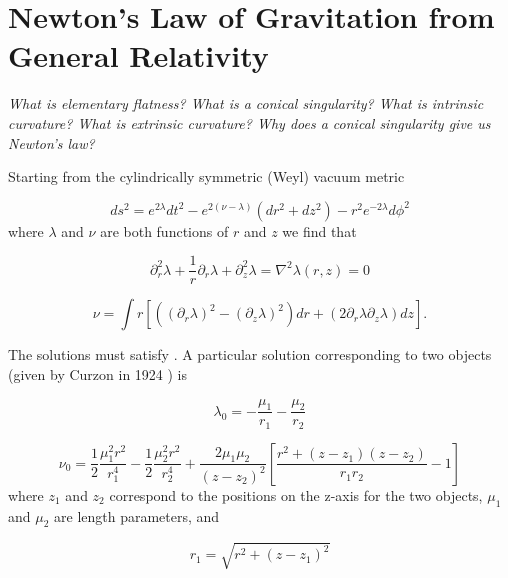 \documentclass[12pt]{article}
\begin{document}
\section{Newton's Law of Gravitation from General Relativity}
\label{sec:newtons-law}

\textit{What is elementary flatness? What is a conical singularity? What is intrinsic curvature? What is extrinsic curvature? Why does a conical singularity give us Newton's law?}

Starting from the cylindrically symmetric (Weyl) vacuum metric \cite{synge_relativity}

\begin{equation}
	ds^{2}=e^{2\lambda}dt^{2}-e^{2\left(\nu-\lambda\right)}\left(dr^{2}+dz^{2}\right)-r^{2}e^{-2\lambda}d\phi^{2}
	\label{eq:weyl-vacuum-metric}
\end{equation}
where $\lambda$ and $\nu$ are both functions of $r$ and $z$ we find that

\begin{equation}
\partial^{2}_{r}\lambda+\frac{1}{r}\partial_{r}\lambda+\partial^{2}_{z}\lambda=\nabla^2\lambda(r,z)=0
\label{eq:laplace-r-z}
\end{equation}

\begin{equation}
\nu=\int r[\left(\left(\partial_{r}\lambda\right)^{2}-\left(\partial_{z}\lambda\right)^{2}\right)dr+\left(2\partial_{r}\lambda\partial_{z}\lambda\right)dz].
\label{eq:nu}
\end{equation}

The solutions must satisfy . A particular solution corresponding to two objects (given by Curzon in 1924 \cite{curzon1924} ) is

\begin{equation}
\lambda_0=-\frac{\mu_1}{r_1}-\frac{\mu_2}{r_2}
\label{eq:lambda-0}
\end{equation}

\begin{equation}
	\label{eq:nu-0}
	\nu_0=\frac{1}{2}\frac{\mu_{1}^{2}r^2}{r_{1}^{4}}-\frac{1}{2}\frac{\mu_{2}^{2}r^2}{r_{2}^{4}}+\frac{2\mu_1\mu_2}{(z-z_2)^2}\left[\frac{r^2+(z-z_1)(z-z_2)}{r_{1}r_{2}}-1\right]
\end{equation}
where $z_1$ and $z_2$ correspond to the positions on the z-axis for the two objects, $\mu_1$ and $\mu_2$ are length parameters, and

\begin{equation}
r_1=\sqrt{r^2+(z-z_1)^2}
\label{eq:r_1}
\end{equation}
\end{document}
